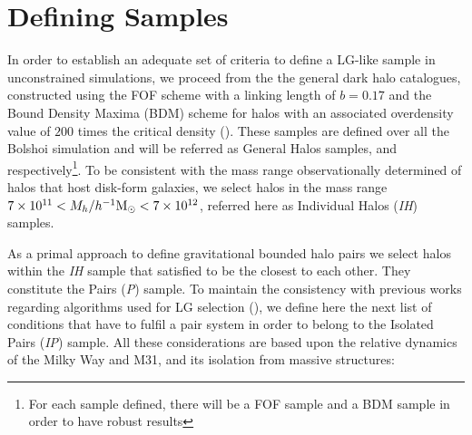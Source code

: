 \documentclass[usenatbib]{latex/mn2e}
\begin{document}
\section{Defining Samples}
\label{section:Def_Samples}



In order to establish an adequate set of criteria to define a LG-like 
sample in unconstrained simulations, we proceed from the the general dark 
halo catalogues, constructed using the FOF scheme with a linking length of 
$b=0.17$ and the Bound Density Maxima (BDM) scheme for halos with an 
associated overdensity value of $200$ times the critical density 
(\SRKED{[references here}). These samples are defined over all the Bolshoi 
simulation and will be referred as General Halos samples, \GHFOF and 
\GHBDM respectively\footnote{For each sample defined, there will be a FOF 
sample and a BDM sample in order to have robust results}. To be consistent 
with the mass range observationally determined of halos that host disk-form 
galaxies, we select halos in the mass range $7\times10^{11} < M_{h}/\hMsun 
< 7\times 10^{12}$, referred here as Individual Halos (\textit{IH}) samples. 



As a primal approach to define gravitational bounded halo pairs we select 
halos within the \textit{IH} sample that satisfied to be the closest to 
each other. They constitute the Pairs (\textit{P}) sample. To maintain the 
consistency with previous works regarding algorithms used for LG selection 
(\SRKED{[references here}), we define here the next list of conditions 
that have to fulfil a pair system in order to belong to the Isolated Pairs 
(\textit{IP}) sample. All these considerations are based upon the relative 
dynamics of the Milky Way and M31, and its isolation from massive 
structures:
\end{document}

